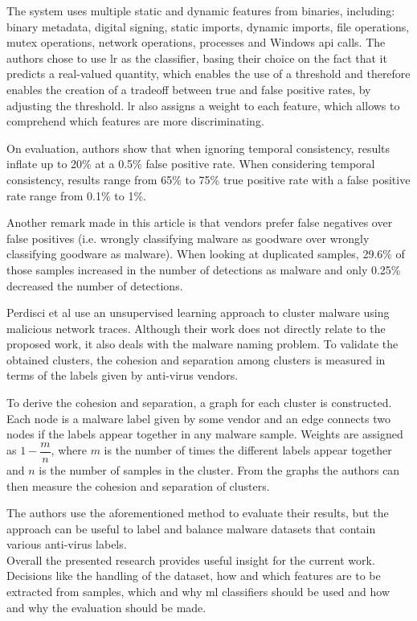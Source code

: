 \documentclass{llncs}
\begin{document}
The system uses multiple static and dynamic features from binaries, including: binary metadata, digital signing, static imports, dynamic imports, file operations, mutex operations, network operations, processes and Windows \gls{api} calls. The authors chose to use \gls{lr} as the classifier, basing their choice on the fact that it predicts a real-valued quantity, which enables the use of a threshold and therefore enables the creation of a tradeoff between true and false positive rates, by adjusting the threshold. \gls{lr} also assigns a weight to each feature, which allows to comprehend which features are more discriminating.

On evaluation, authors show that when ignoring temporal consistency, results inflate up to 20\% at a 0.5\% false positive rate. When considering temporal consistency, results range from 65\% to 75\% true positive rate with a false positive rate range from 0.1\% to 1\%.

Another remark made in this article is that vendors prefer false negatives over false positives (i.e. wrongly classifying malware as goodware over wrongly classifying goodware as malware). When looking at duplicated samples, 29.6\% of those samples increased in the number of detections as malware and only 0.25\% decreased the number of detections.

Perdisci et al\cite{perdisci:behavior} use an unsupervised learning approach to cluster malware using malicious network traces. Although their work does not directly relate to the proposed work, it also deals with the malware naming problem. To validate the obtained clusters, the cohesion and separation among clusters is measured in terms of the labels given by anti-virus vendors.

To derive the cohesion and separation, a graph for each cluster is constructed. Each node is a malware label given by some vendor and an edge connects two nodes if the labels appear together in any malware sample. Weights are assigned as $1 - \dfrac{m}{n}$, where $m$ is the number of times the different labels appear together and $n$ is the number of samples in the cluster. From the graphs the authors can then measure the cohesion and separation of clusters.

The authors use the aforementioned method to evaluate their results, but the approach can be useful to label and balance malware datasets that contain various anti-virus labels.\\

Overall the presented research provides useful insight for the current work. Decisions like the handling of the dataset, how and which features are to be extracted from samples, which and why \gls{ml} classifiers should be used and how and why the evaluation should be made.
\end{document}
